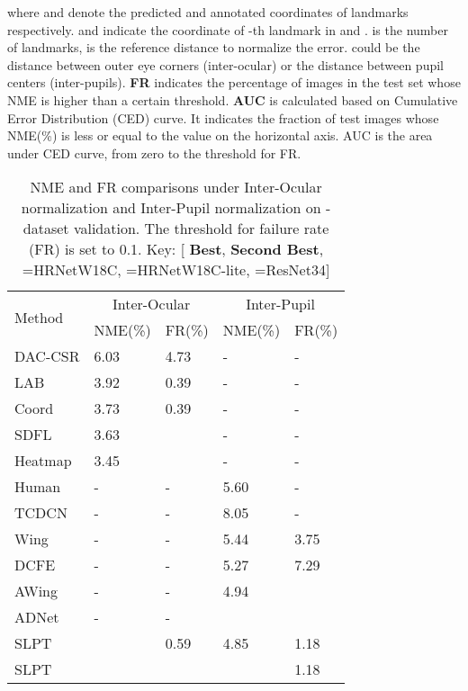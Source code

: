 \documentclass[10pt,twocolumn,letterpaper]{article}
\begin{document}
where  and  denote the predicted and annotated coordinates of landmarks respectively.  and  indicate the coordinate of -th landmark in  and .  is the number of landmarks,  is the reference distance to normalize the error.  could be the distance between outer eye corners (inter-ocular) or the distance between pupil centers (inter-pupils). \textbf{FR} indicates the percentage of images in the test set whose NME is higher than a certain threshold. \textbf{AUC} is calculated based on Cumulative Error Distribution (CED) curve. It indicates the fraction of test images whose NME(\%) is less or equal to the value on the horizontal axis. AUC is the area under CED curve, from zero to the threshold for FR.


\begin{table}[t!]
	\centering
	\begin{tabular}{m{2.2cm}<{\centering}|m{1.05cm}<{\centering}m{0.95cm}<{\centering}|m{1.05cm}<{\centering}m{0.95cm}<{\centering}}
		\hline
		\multirow{2}{*}{Method} &  \multicolumn{2}{c|}{Inter-Ocular} & \multicolumn{2}{c}{Inter-Pupil} \\
		& NME(\%) & FR(\%) & NME(\%) & FR(\%) \\  \hline
		DAC-CSR \cite{DAC-CSR} & 6.03 & 4.73 & - & -\\
		LAB \cite{LAB} & 3.92 & 0.39 & - & -\\
		Coord \cite{HRnet} & 3.73 & 0.39 &- & -\\
		SDFL \cite{SCDF} & 3.63 & {\color{red} } & - & - \\
		Heatmap \cite{HRnet} & 3.45 & {\color{blue} } & - & -\\
		Human \cite{COFW} & -& - & 5.60 & - \\
		TCDCN \cite{TCDNN} & - & - & 8.05 & - \\
		Wing \cite{Wing} &-&- & 5.44 & 3.75 \\
		DCFE \cite{DCFE} &-&-& 5.27 & 7.29 \\
		AWing \cite{Awing} &-&-& 4.94 & {\color{blue} } \\
		ADNet \cite{ADNet} &-&-& {\color{red} } & {\color{red} } \\ \hline
		SLPT  & {\color{blue} } & 0.59 & 4.85 &  1.18\\
		SLPT & {\color{red} } & {\color{red} } & {\color{blue} } & 1.18 \\ \hline		
	\end{tabular}
	\caption{NME and FR comparisons under Inter-Ocular normalization and Inter-Pupil normalization on -dataset validation. The threshold for failure rate (FR) is set to 0.1. Key: [{\color{red} \textbf{Best}}, {\color{blue} \textbf{Second Best}}, =HRNetW18C, =HRNetW18C-lite, =ResNet34]}
	\label{Tabal3}
\end{table}
\end{document}
